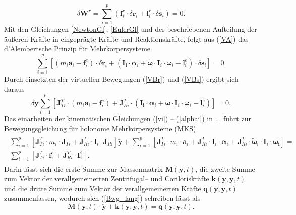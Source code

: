 \begin{equation}\label{VA}
\delta\pmb{W}^r = \sum_{i=1}^p(\pmb{f}_i^r\cdot \delta \pmb{r}_i + \pmb{l}^r_i\cdot\delta\pmb{s}_i)=0.
\end{equation}
Mit den Gleichungen \ref{NewtonGl}, \ref{EulerGl} und der beschriebenen Aufteilung der äußeren Kräfte in eingeprägte Kräfte und Reaktionskräfte, folgt aus (\ref{VA}) das d’Alembertsche Prinzip für Mehrkörpersysteme
\begin{equation}\label{VA}
\sum_{i=1}^p\left[ (m_i\pmb{a}_i-\pmb{f}_i^e)\cdot \delta \pmb{r}_i + (\pmb{I_i}\cdot \pmb{\alpha}_i + \tilde{\pmb{\omega}}\cdot\pmb{I}_i\cdot\pmb{\omega}_i-\pmb{l}^e_i)\cdot\delta\pmb{s}_i\right] =0.
\end{equation}
Durch einsetzten der virtuellen Bewegungen (\ref{VBr}) und (\ref{VBs}) ergibt sich daraus
\begin{equation}
\delta\pmb{y}\sum_{i=1}^p\left[\pmb{J}^T_{Ti}\cdot(m_i\pmb{a}_i-\pmb{f}_i^e)+ \pmb{J}^T_{Ri}\cdot(\pmb{I_i}\cdot \pmb{\alpha}_i + \tilde{\pmb{\omega}}\cdot\pmb{I}_i\cdot\pmb{\omega}_i-\pmb{l}^e_i)\right]=0.
\end{equation}
Das einarbeiten der kinematischen Gleichungen (\ref{vi}) -- (\ref{alphai}) in ... führt zur Bewegungsgleichung für holonome Mehrkörpersysteme (MKS) 
\begin{align}\label{Bwg_lang}
\begin{split}
\sum_{i=1}^p\left[\pmb{J}_{Ti}^T\cdot m_i \cdot \pmb{J}_{Ti} + \pmb{J}_{Ri}^T\cdot \pmb{I}_i \cdot \pmb{J}_{Ri}\right]\ddot{\pmb{y}}+\sum_{i=1}^p\left[\pmb{J}_{Ti}^T\cdot m_i \cdot \overline{\pmb{a}}_i + \pmb{J}^T_{Ri}\cdot\pmb{I}_i\cdot\overline{\pmb{\alpha}}_i+\pmb{J}^T_{Ri}\cdot\tilde{\pmb{\omega}}_i\cdot\pmb{I}_i\cdot\pmb{\omega_i}\right]=\\ \sum_{i=1}^p\left[\pmb{J}^T_{Ti}\cdot\pmb{f}_i^e + \pmb{J}_{Ri}^T\cdot\pmb{I}_i^e\right].
\end{split}
\end{align}
Darin lässt sich die erste Summe zur Massenmatrix $\pmb{M}(\pmb{y},t)$, die zweite Summe zum Vektor der verallgemeinerten Zentrifugal-- und Coriloriskräfte $\pmb{k}(\pmb{y},\dot{\pmb{y}},t)$ und die dritte Summe zum Vektor der verallgemeinerten Kräfte $\pmb{q}(\pmb{y},\dot{\pmb{y}},t)$ zusammenfassen, wodurch sich (\ref{Bwg_lang}) schreiben lässt als
\begin{equation}\label{Bwg}
\pmb{M}(\pmb{y},t)\cdot\ddot{\pmb{y}}+\pmb{k}(\pmb{y},\dot{\pmb{y}},t) = \pmb{q}(\pmb{y},\dot{\pmb{y}},t).
\end{equation}
  


